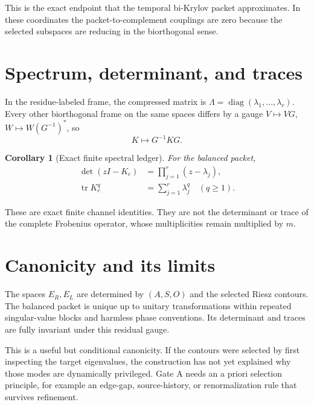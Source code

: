 \documentclass[12pt]{article}
\newtheorem{corollary}[theorem]{Corollary}
\theoremstyle{remark}
\begin{document}
This is the exact endpoint that the temporal bi-Krylov packet approximates.
In these coordinates the packet-to-complement couplings are zero because
the selected subspaces are reducing in the biorthogonal sense.

\section{Spectrum, determinant, and traces}

In the residue-labeled frame, the compressed matrix is
$\Lambda=\operatorname{diag}(\lambda_1,\ldots,\lambda_r)$.  Every other
biorthogonal frame on the same spaces differs by a gauge
$V\mapsto VG$, $W\mapsto W(G^{-1})^*$, so
\begin{equation}\label{eq:gauge-similarity}
 K\mapsto G^{-1}KG.
\end{equation}

\begin{corollary}[Exact finite spectral ledger]\label{cor:ledger}
For the balanced packet,
\begin{align}
 \det(zI-K_c)&=\prod_{j=1}^r(z-\lambda_j),\label{eq:determinant}\\
 \operatorname{tr}K_c^q&=\sum_{j=1}^r\lambda_j^q
 \quad(q\ge1).\label{eq:traces}
\end{align}
\end{corollary}

These are exact finite channel identities.  They are not the determinant or
trace of the complete Frobenius operator, whose multiplicities remain
multiplied by $m$.

\section{Canonicity and its limits}

The spaces $E_R,E_L$ are determined by $(A,S,O)$ and the selected Riesz
contours.  The balanced packet is unique up to unitary transformations within
repeated singular-value blocks and harmless phase conventions.  Its
determinant and traces are fully invariant under this residual gauge.

This is a useful but conditional canonicity.  If the contours were selected
by first inspecting the target eigenvalues, the construction has not yet
explained why those modes are dynamically privileged.  Gate A needs an
a priori selection principle, for example an edge-gap, source-history, or
renormalization rule that survives refinement.
\end{document}
